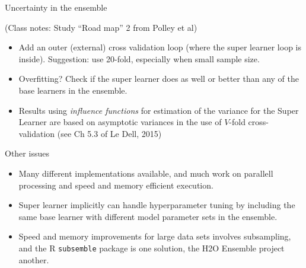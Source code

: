 \documentclass[
  ignorenonframetext,
]{beamer}
\providecommand{\tightlist}{%
  \setlength{\itemsep}{0pt}\setlength{\parskip}{0pt}}
\begin{document}
\begin{frame}

\begin{block}{Uncertainty in the ensemble}

(Class notes: Study ``Road map'' 2 from Polley et al)

\begin{itemize}
\tightlist
\item
  Add an outer (external) cross validation loop (where the super learner
  loop is inside). Suggestion: use 20-fold, especially when small sample
  size.
\item
  Overfitting? Check if the super learner does as well or better than
  any of the base learners in the ensemble.
\item
  Results using \emph{influence functions} for estimation of the
  variance for the Super Learner are based on asymptotic variances in
  the use of \(V\)-fold cross-validation (see Ch 5.3 of Le Dell, 2015)
\end{itemize}

\end{block}

\end{frame}

\begin{frame}[fragile]

\begin{block}{Other issues}

\begin{itemize}
\tightlist
\item
  Many different implementations available, and much work on parallell
  processing and speed and memory efficient execution.
\item
  Super learner implicitly can handle hyperparameter tuning by including
  the same base learner with different model parameter sets in the
  ensemble.
\item
  Speed and memory improvements for large data sets involves
  subsampling, and the R \texttt{subsemble} package is one solution, the
  H2O Ensemble project another.
\end{itemize}

\end{block}

\end{frame}
\end{document}
